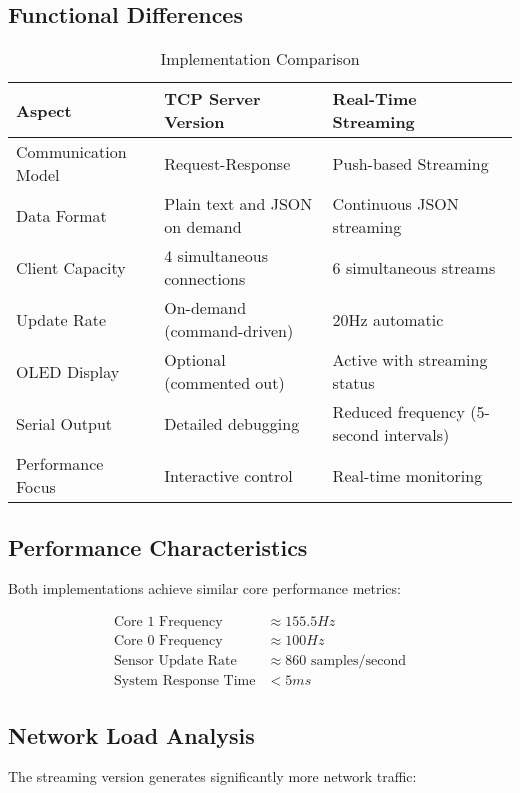 \documentclass[12pt,a4paper]{article}
\begin{document}
\subsection{Functional Differences}

\begin{table}[H]
\centering
\caption{Implementation Comparison}
\begin{tabular}{|p{3cm}|p{5cm}|p{5cm}|}
\hline
\textbf{Aspect} & \textbf{TCP Server Version} & \textbf{Real-Time Streaming} \\
\hline
Communication Model & Request-Response & Push-based Streaming \\
\hline
Data Format & Plain text and JSON on demand & Continuous JSON streaming \\
\hline
Client Capacity & 4 simultaneous connections & 6 simultaneous streams \\
\hline
Update Rate & On-demand (command-driven) & 20Hz automatic \\
\hline
OLED Display & Optional (commented out) & Active with streaming status \\
\hline
Serial Output & Detailed debugging & Reduced frequency (5-second intervals) \\
\hline
Performance Focus & Interactive control & Real-time monitoring \\
\hline
\end{tabular}
\end{table}

\subsection{Performance Characteristics}

Both implementations achieve similar core performance metrics:

\begin{align}
\text{Core 1 Frequency} &\approx 155.5Hz \\
\text{Core 0 Frequency} &\approx 100Hz \\
\text{Sensor Update Rate} &\approx 860 \text{ samples/second} \\
\text{System Response Time} &< 5ms
\end{align}

\subsection{Network Load Analysis}

The streaming version generates significantly more network traffic:
\end{document}
